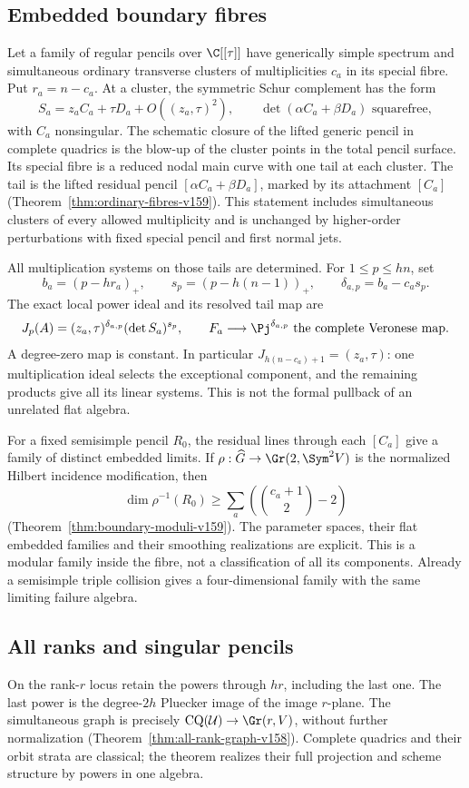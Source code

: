 \subsection{Embedded boundary fibres}
Let a family of regular pencils over $\C[[\tau]]$ have generically
simple spectrum and simultaneous ordinary transverse clusters of
multiplicities $c_a$ in its special fibre. Put $r_a=n-c_a$.
At a cluster, the symmetric Schur complement has the form
\[
 S_a=z_a C_a+\tau D_a+O((z_a,\tau)^2),\qquad
 \det(\alpha C_a+\beta D_a)\text{ squarefree},
\]
with $C_a$ nonsingular. The schematic closure of the lifted generic
pencil in complete quadrics is the blow-up of the cluster points in
the total pencil surface. Its special fibre is a reduced nodal main
curve with one tail at each cluster. The tail is the lifted residual
pencil $[\alpha C_a+\beta D_a]$, marked by its attachment $[C_a]$
(Theorem~\ref{thm:ordinary-fibres-v159}). This statement includes
simultaneous clusters of every allowed multiplicity and is unchanged
by higher-order perturbations with fixed special pencil and first
normal jets.

All multiplication systems on those tails are determined. For
$1\leq p\leq hn$, set
\[
 b_a=(p-hr_a)_+,\qquad s_p=(p-h(n-1))_+,\qquad
 \delta_{a,p}=b_a-c_a s_p.
\]
The exact local power ideal and its resolved tail map are
\[
 J_p(A)=(z_a,\tau)^{\delta_{a,p}}(\det S_a)^{s_p},
 \qquad F_a\longrightarrow\Pj^{\delta_{a,p}}
               \text{ the complete Veronese map}.
\]
A degree-zero map is constant. In particular
$J_{h(n-c_a)+1}=(z_a,\tau)$: one multiplication ideal selects the
exceptional component, and the remaining products give all its linear
systems. This is not the formal pullback of an unrelated flat algebra.

For a fixed semisimple pencil $R_0$, the residual lines through each
$[C_a]$ give a family of distinct embedded limits. If
$\rho:\widehat G\to\Gr(2,\Sym^2V)$ is the normalized Hilbert incidence
modification, then
\[
 \dim\rho^{-1}(R_0)\geq
             \sum_a\left(\binom{c_a+1}{2}-2\right)
\]
(Theorem~\ref{thm:boundary-moduli-v159}). The parameter spaces, their
flat embedded families and their smoothing realizations are explicit.
This is a modular family inside the fibre, not a classification of
all its components. Already a semisimple triple collision gives a
four-dimensional family with the same limiting failure algebra.

\subsection{All ranks and singular pencils}
On the rank-$r$ locus retain the powers through $hr$, including the
last one. The last power is the degree-$2h$ Pluecker image of the
image $r$-plane. The simultaneous graph is precisely
$\mathrm{CQ}(\mathcal U)\to\Gr(r,V)$, without further normalization
(Theorem~\ref{thm:all-rank-graph-v158}). Complete quadrics and their
orbit strata are classical; the theorem realizes their full projection
and scheme structure by powers in one algebra.

